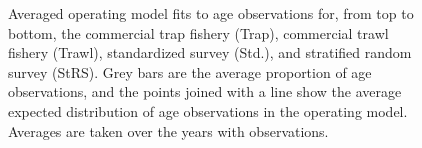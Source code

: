 \documentclass[11pt]{book}
\begin{document}
\begin{figure}[htb]

{\centering {} 

}

\caption{Averaged operating model fits to age observations for, from top to bottom, the commercial trap fishery (Trap), commercial trawl fishery (Trawl), standardized survey (Std.), and stratified random survey (StRS). Grey bars are the average proportion of age observations, and the points joined with a line show the average expected distribution of age observations in the operating model. Averages are taken over the years with observations.}\label{fig:unnamed-chunk-14}
\end{figure}
\newpage
\end{document}

